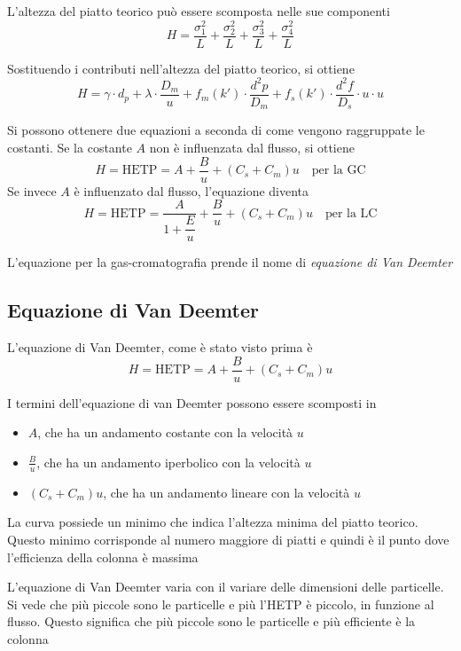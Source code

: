 L'altezza del piatto teorico può essere scomposta nelle sue componenti
\[
H = \frac{\sigma^2_1}{L} + \frac{\sigma^2_2}{L} + \frac{\sigma^2_3}{L} + \frac{\sigma^2_4}{L}
\]

Sostituendo i contributi nell'altezza del piatto teorico, si ottiene
\[
H = \gamma \cdot d_p + \lambda \cdot \frac{D_m}{u} + f_m (k') \cdot \frac{d^2 p}{D_m} + f_s (k') \cdot \frac{d^2 f}{D_s} \cdot u \cdot u
\]

Si possono ottenere due equazioni a seconda di come vengono raggruppate le costanti. Se la costante $A$ non è influenzata dal flusso, si ottiene 
\[
H = \text{HETP} = A + \frac{B}{u} + (C_s + C_m)u \quad \text{per la GC}
\]
Se invece $A$ è influenzato dal flusso, l'equazione diventa
\[
H = \text{HETP} = \frac{A}{1 + \dfrac{E}{u}} + \frac{B}{u} + (C_s + C_m)u \quad \text{per la LC}
\]

L'equazione per la gas-cromatografia prende il nome di \emph{equazione di Van Deemter}

\subsection{Equazione di Van Deemter}

L'equazione di Van Deemter, come è stato visto prima è 
\[
H = \text{HETP} = A + \frac{B}{u} + (C_s + C_m)u 
\]

I termini dell'equazione di van Deemter possono essere scomposti in
\begin{itemize}
\item $A$, che ha un andamento costante con la velocità $u$
\item $\frac{B}{u}$, che ha un andamento iperbolico con la velocità $u$
\item $(C_s + C_m)u$, che ha un andamento lineare con la velocità $u$
\end{itemize}


La curva possiede un minimo che indica l'altezza minima del piatto teorico.
Questo minimo corrisponde al numero maggiore di piatti e quindi è il punto dove l'efficienza della colonna è massima

L'equazione di Van Deemter varia con il variare delle dimensioni delle particelle.
Si vede che più piccole sono le particelle e più l'HETP è piccolo, in funzione al flusso.
Questo significa che più piccole sono le particelle e più efficiente è la colonna


